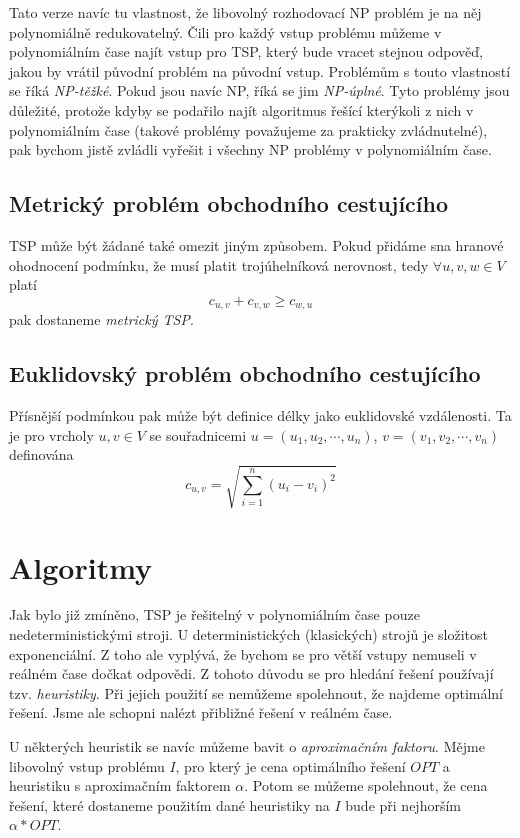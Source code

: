 \documentclass[
  biblatex,
  figures=false,
  glossaries,
  index
]{kidiplom}
\begin{document}
Tato verze navíc tu vlastnost, že libovolný rozhodovací NP problém je na něj polynomiálně redukovatelný. Čili pro každý vstup problému můžeme v polynomiálním čase najít vstup pro TSP, který bude vracet stejnou odpověď, jakou by vrátil původní problém na původní vstup. Problémům s touto vlastností se říká \textit{NP-těžké}. Pokud jsou navíc NP, říká se jim \textit{NP-úplné}. Tyto problémy jsou důležité, protože kdyby se podařilo najít algoritmus řešící kterýkoli z nich v polynomiálním čase (takové problémy považujeme za prakticky zvládnutelné), pak bychom jistě zvládli vyřešit i všechny NP problémy v polynomiálním čase.

\subsection{Metrický problém obchodního cestujícího}
TSP může být žádané také omezit jiným způsobem. Pokud přidáme sna hranové ohodnocení podmínku, že musí platit trojúhelníková nerovnost, tedy $\forall u, v, w \in V$ platí $$c_{u, v} + c_{v, w} \ge c_{w, u}$$
pak dostaneme \textit{metrický TSP}.

\subsection{Euklidovský problém obchodního cestujícího}
Přísnější podmínkou pak může být definice délky jako euklidovské vzdálenosti. Ta je pro vrcholy $u, v \in V$ se souřadnicemi $u = (u_1, u_2, \cdots, u_n)$, $v = (v_1, v_2, \cdots, v_n)$ definována
$$
c_{u, v} = \sqrt{\sum_{i=1}^{n} (u_i - v_i)^2}
$$
\pagebreak
\section{Algoritmy}
Jak bylo již zmíněno, TSP je řešitelný v polynomiálním čase pouze nedeterministickými stroji. U deterministických (klasických) strojů je složitost exponenciální. Z toho ale vyplývá, že bychom se pro větší vstupy nemuseli v reálném čase dočkat odpovědi. Z tohoto důvodu se pro hledání řešení používají tzv. \textit{heuristiky}. Při jejich použití se nemůžeme spolehnout, že najdeme optimální řešení. Jsme ale schopni nalézt přibližné řešení v reálném čase.

U některých heuristik se navíc můžeme bavit o \textit{aproximačním faktoru}. Mějme libovolný vstup problému $I$, pro který je cena optimálního řešení $OPT$ a heuristiku s aproximačním faktorem $\alpha$. Potom se můžeme spolehnout, že cena řešení, které dostaneme použitím dané heuristiky na $I$ bude při nejhorším $\alpha * OPT$.
\end{document}
